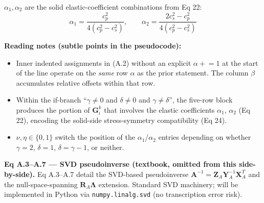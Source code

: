 \medskip

$\alpha_1, \alpha_2$ are the solid elastic-coefficient combinations
from Eq 22:
\begin{equation*}
  \alpha_1 = \frac{c_p^2}{4(c_p^2 - c_s^2)},\qquad
  \alpha_2 = \frac{2 c_s^2 - c_p^2}{4(c_p^2 - c_s^2)}
\end{equation*}

\medskip

\textbf{Reading notes (subtle points in the pseudocode):}
\begin{itemize}
  \item Inner indented assignments in (A.2) without an explicit
    $\alpha \mathrel{+}= 1$ at the start of the line operate on
    the \emph{same} row $\alpha$ as the prior statement. The
    column $\beta$ accumulates relative offsets within that
    row.
  \item Within the if-branch ``$\gamma \neq 0$ and $\delta \neq 0$
    and $\gamma \neq \delta$'', the five-row block produces the
    portion of $\boldsymbol{G}_i^k$ that involves the elastic
    coefficients $\alpha_1$, $\alpha_2$ (Eq 22), encoding the
    solid-side stress-symmetry compatibility (Eq 24).
  \item $\nu, \eta \in \{0, 1\}$ switch the position of the
    $\alpha_1$/$\alpha_2$ entries depending on whether
    $\gamma = 2$, $\delta = 1$, $\delta = \gamma - 1$, or
    neither.
\end{itemize}

\medskip

\textbf{Eq A.3--A.7 --- SVD pseudoinverse (textbook, omitted from
this side-by-side).} Eq A.3--A.7 detail the SVD-based pseudoinverse
$\boldsymbol{A}^{-1} = \boldsymbol{Z}_A \boldsymbol{Y}_A^{-1}
\boldsymbol{X}_A^T$ and the null-space-spanning $\boldsymbol{R}_A
\boldsymbol{\Lambda}$ extension. Standard SVD machinery; will be
implemented in Python via \texttt{numpy.linalg.svd} (no
transcription error risk).

